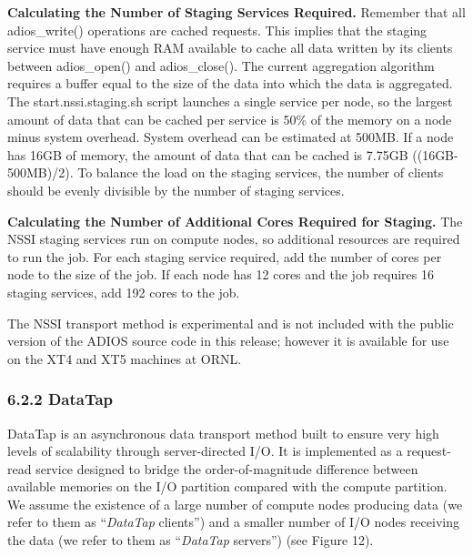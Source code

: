 \vspace{6pt}
\textbf{Calculating the Number of Staging Services Required.}  Remember that all 
adios\_write() operations are cached requests.  This implies that the staging service 
must have enough RAM available to cache all data written by its clients between 
adios\_open() and adios\_close().  The current aggregation algorithm requires a 
buffer equal to the size of the data into which the data is aggregated.  The start.nssi.staging.sh 
script launches a single service per node, so the largest amount of data that can 
be cached per service is 50\% of the memory on a node minus system overhead.  System 
overhead can be estimated at 500MB.  If a node has 16GB of memory, the amount of 
data that can be cached is 7.75GB ((16GB-500MB)/2).  To balance the load on the 
staging services, the number of clients should be evenly divisible by the number 
of staging services.

\vspace{6pt}
\textbf{Calculating the Number of Additional Cores Required for Staging.}  The 
NSSI staging services run on compute nodes, so additional resources are required 
to run the job.  For each staging service required, add the number of cores per 
node to the size of the job.  If each node has 12 cores and the job requires 16 
staging services, add 192 cores to the job.

\vspace{6pt}
The NSSI transport method is experimental and is not included with the public version 
of the ADIOS source code in this release; however it is available for use on the 
XT4 and XT5 machines at ORNL.\label{HToc84890266}\label{HToc212016642}\label{HToc212016884}\label{HToc182553391}

\vspace{6pt}
\subsubsection*{{\large \textbf{6.2.2 DataTap}}}

\vspace{10pt}
DataTap is an asynchronous data transport method built to ensure very high levels 
of scalability through server-directed I/O. It is implemented as a request-read 
service designed to bridge the order-of-magnitude difference between available 
memories on the I/O partition compared with the compute partition. We assume the 
existence of a large number of compute nodes producing data (we refer to them as 
``\textit{DataTap }clients'') and a smaller number of I/O nodes receiving the data 
(we refer to them as ``\textit{DataTap }servers'') (see Figure 12). 

